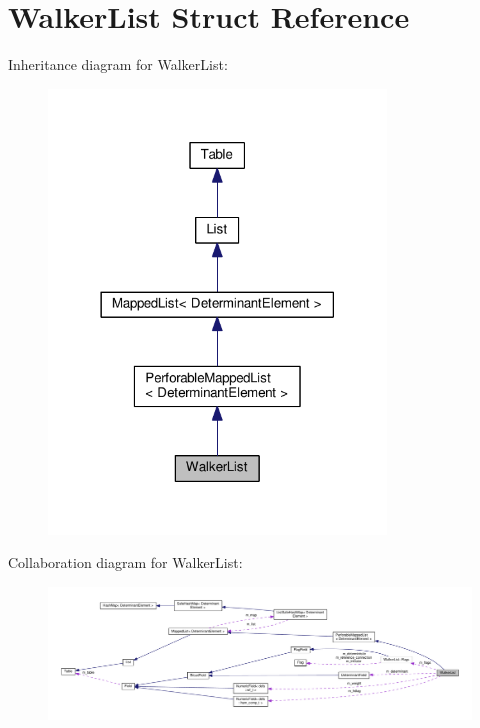 \hypertarget{structWalkerList}{}\section{Walker\+List Struct Reference}
\label{structWalkerList}


Inheritance diagram for Walker\+List\+:\nopagebreak
\begin{figure}[H]
\begin{center}
\leavevmode
\includegraphics[width=254pt]{structWalkerList__inherit__graph}
\end{center}
\end{figure}


Collaboration diagram for Walker\+List\+:\nopagebreak
\begin{figure}[H]
\begin{center}
\leavevmode
\includegraphics[width=350pt]{structWalkerList__coll__graph}
\end{center}
\end{figure}
